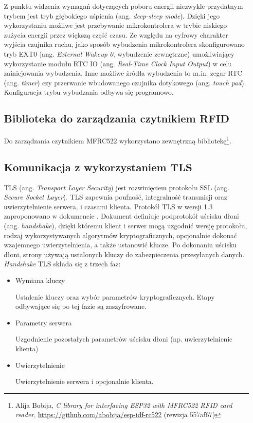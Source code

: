             Z punktu widzenia wymagań dotyczących poboru energii niezwykle przydatnym trybem jest tryb głębokiego uśpienia (ang. \textit{deep-sleep mode}). Dzięki jego wykorzystaniu możliwe jest przebywanie mikrokontrolera w trybie niskiego zużycia energii przez większą część czasu. Ze względu na cyfrowy charakter wyjścia czujnika ruchu, jako sposób wybudzenia mikrokontrolera skonfigurowano tryb EXT0 (ang. \textit{External Wakeup 0}, wybudzenie zewnętrzne) umożliwiający wykorzystanie modułu RTC IO (ang. \textit{Real-Time Clock Input Output}) w celu zainicjowania wybudzenia. Inne możliwe źródła wybudzenia to m.in. zegar RTC (ang. \textit{timer}) czy przerwanie wbudowanego czujnika dotykowego (ang. \textit{touch pad}). Konfiguracja trybu wybudzania odbywa się programowo.

        \subsection{Biblioteka do zarządzania czytnikiem RFID}
        \label{sub:rfid_lib}

            Do zarządzania czytnikiem MFRC522 wykorzystano zewnętrzną bibliotekę\footnote{Alija Bobija, \textit{C library for interfacing ESP32 with MFRC522 RFID card reader}, \url{https://github.com/abobija/esp-idf-rc522} (rewizja 557af67)}.

        \subsection{Komunikacja z wykorzystaniem TLS}

            TLS (ang. \textit{Transport Layer Security}) jest rozwinięciem protokołu SSL (ang. \textit{Secure Socket Layer}). TLS zapewnia poufność, integralność transmisji oraz uwierzytelnienie serwera, i czasami klienta. 
            Protokół TLS w wersji 1.3 zaproponowano w dokumencie \cite{rfc8446}. Dokument definiuje podprotokół uścisku dłoni (ang. \textit{handshake}), dzięki któremu klient i serwer mogą uzgodnić wersję protokołu, rodzaj wykorzystywanych algorytmów kryptograficznych, opcjonalnie dokonać wzajemnego uwierzytelnienia, a także ustanowić klucze. Po dokonaniu uścisku dłoni, strony używają ustalonych kluczy do zabezpieczenia przesyłanych danych.
            \textit{Handshake} TLS składa się z trzech faz:

            \begin{itemize}

                \item Wymiana kluczy

                    Ustalenie kluczy oraz wybór parametrów kryptograficznych. Etapy odbywające się po tej fazie są zaszyfrowane.

                \item Parametry serwera

                    Uzgodnienie pozostałych parametrów uścisku dłoni (np. uwierzytelnienie klienta)

                \item Uwierzytelnienie

                    Uwierzytelnienie serwera i opcjonalnie klienta.
            \end{itemize}

